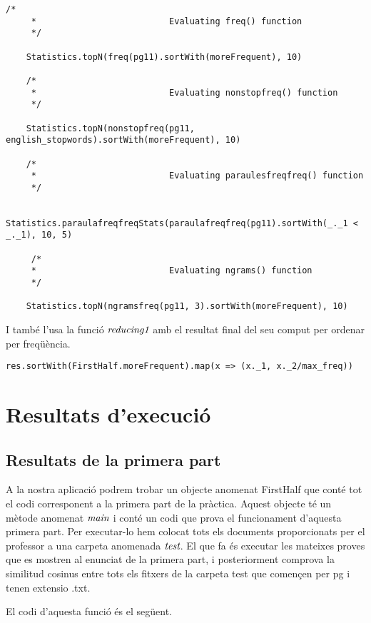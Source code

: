 \documentclass{report}
\begin{document}
\begin{lstlisting}[style=scalaHighlight]
/*
     * 							Evaluating freq() function
     */

    Statistics.topN(freq(pg11).sortWith(moreFrequent), 10)

    /*
     * 							Evaluating nonstopfreq() function
     */

    Statistics.topN(nonstopfreq(pg11, english_stopwords).sortWith(moreFrequent), 10)

    /*
     * 							Evaluating paraulesfreqfreq() function
     */

    Statistics.paraulafreqfreqStats(paraulafreqfreq(pg11).sortWith(_._1 < _._1), 10, 5)

     /*
     * 							Evaluating ngrams() function
     */

    Statistics.topN(ngramsfreq(pg11, 3).sortWith(moreFrequent), 10)
\end{lstlisting}

I també l'usa la funció $ \emph{reducing1} $ amb el resultat final del seu comput per ordenar per freqüència.

\begin{lstlisting}[style=scalaHighlight]
    res.sortWith(FirstHalf.moreFrequent).map(x => (x._1, x._2/max_freq))
\end{lstlisting}

\chapter{Resultats d'execució}

\section{Resultats de la primera part}

A la nostra aplicació podrem trobar un objecte anomenat FirstHalf que conté tot el codi corresponent a la primera part de la pràctica. Aquest objecte té un mètode anomenat $\emph{main}$ i conté un codi que prova el funcionament d'aquesta primera part. Per executar-lo hem colocat tots els documents proporcionats per el professor a una carpeta anomenada $\emph{test}$. El que fa és executar les mateixes proves que es mostren al enunciat de la primera part, i posteriorment comprova la similitud cosinus entre tots els fitxers de la carpeta test que començen per pg i tenen extensio .txt.

\newpage

El codi d'aquesta funció és el següent.
\end{document}
